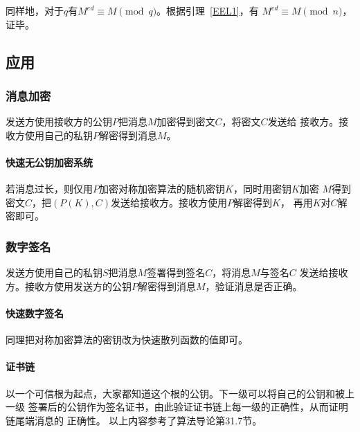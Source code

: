 同样地，对于$q$有$M^{ed}\equiv M \pmod{q}$。根据引理~\ref{EEL1}，有
$M^{ed}\equiv M \pmod{n}$，证毕。

\subsection{应用}
\subsubsection{消息加密}
发送方使用接收方的公钥$P$把消息$M$加密得到密文$C$，将密文$C$发送给
接收方。接收方使用自己的私钥$P$解密得到消息$M$。
\paragraph{快速无公钥加密系统}
若消息过长，则仅用$P$加密对称加密算法的随机密钥$K$，同时用密钥$K$加密
$M$得到密文$C$，把$(P(K),C)$发送给接收方。接收方使用$P$解密得到$K$，
再用$K$对$C$解密即可。
\subsubsection{数字签名}
发送方使用自己的私钥$S$把消息$M$签署得到签名$C$，将消息$M$与签名$C$
发送给接收方。接收方使用发送方的公钥$P$解密得到消息$M$，验证消息是否正确。
\paragraph{快速数字签名}
同理把对称加密算法的密钥改为快速散列函数的值即可。
\paragraph{证书链}
以一个可信根为起点，大家都知道这个根的公钥。下一级可以将自己的公钥和被上一级
签署后的公钥作为签名证书，由此验证证书链上每一级的正确性，从而证明链尾端消息的
正确性。
以上内容参考了算法导论\cite{ITA3}第31.7节。
